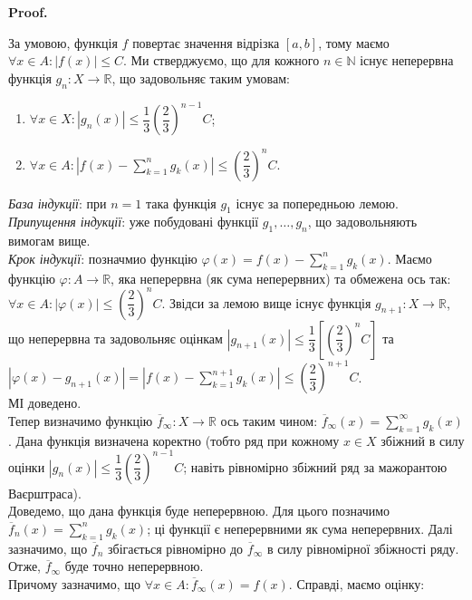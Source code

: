 \documentclass[a4paper, 10pt]{article}
\makeatletter
\theoremstyle{theoremdd}
\renewenvironment{proof}[1][Proof.\\]{\par
\pushQED{\hfill \qed}%
\normalfont \topsep6\p@\@plus6\p@\relax
\trivlist
\item\relax
{\bfseries
#1\@addpunct{.}}\hspace\labelsep\ignorespaces
}{%
\popQED\endtrivlist\@endpefalse
}
\makeatother
\begin{document}
\begin{proof}
За умовою, функція $f$ повертає значення відрізка $[a,b]$, тому маємо $\forall x \in A: |f(x)| \leq C$. Ми стверджуємо, що для кожного $n \in \mathbb{N}$ існує неперервна функція $g_n \colon X \to \mathbb{R}$, що задовольняє таким умовам:
\begin{enumerate}[nosep,wide=0pt,label={\arabic*)}]
\item $\forall x \in X: |g_n(x)| \leq \dfrac{1}{3} \left( \dfrac{2}{3}\right)^{n-1} C$;
\item $\forall x \in A: \displaystyle\left| f(x) - \sum_{k=1}^n g_k(x) \right| \leq \left( \dfrac{2}{3} \right)^n C$.
\end{enumerate}
\textit{База індукції}: при $n = 1$ така функція $g_1$ існує за попередньою лемою.\\
\textit{Припущення індукції}: уже побудовані функції $g_1,\dots,g_n$, що задовольняють вимогам вище.\\
\textit{Крок індукції}: позначмио функцію $\varphi(x) = \displaystyle f(x) - \sum_{k=1}^n g_k(x)$. Маємо функцію $\varphi \colon A \to \mathbb{R}$, яка неперервна (як сума неперервних) та обмежена ось так: $\forall x \in A: |\varphi(x)| \leq \left( \dfrac{2}{3} \right)^n C$. Звідси за лемою вище існує функція $g_{n+1} \colon X \to \mathbb{R}$, що неперервна та задовольняє оцінкам $|g_{n+1}(x)| \leq \dfrac{1}{3} \left[ \left(\dfrac{2}{3}\right)^n C \right]$ та $|\varphi(x) - g_{n+1}(x)| = \displaystyle\left| f(x) - \sum_{k=1}^{n+1} g_k(x) \right| \leq \left( \dfrac{2}{3} \right)^{n+1}C$.\\
МІ доведено. \\
Тепер визначимо функцію $\overline{f}_{\infty} \colon X \to \mathbb{R}$ ось таким чином: $\overline{f}_\infty(x) = \displaystyle\sum_{k=1}^\infty g_k(x)$. Дана функція визначена коректно (тобто ряд при кожному $x \in X$ збіжний в силу оцінки $|g_n(x)| \leq \dfrac{1}{3} \left( \dfrac{2}{3}\right)^{n-1}C$; навіть рівномірно збіжний ряд за мажорантою Ваєрштраса). \\
Доведемо, що дана функція буде неперервною. Для цього позначимо $\overline{f}_n(x) = \displaystyle\sum_{k=1}^n g_k(x)$; ці функції є неперервними як сума неперервних. Далі зазначимо, що $\overline{f}_n$ збігається рівномірно до $\overline{f}_\infty$ в силу рівномірної збіжності ряду. Отже, $\overline{f}_\infty$ буде точно неперервною.\\
Причому зазначимо, що $\forall x \in A: \overline{f}_\infty(x) = f(x)$. Справді, маємо оцінку:\\

\end{proof}
\end{document}
